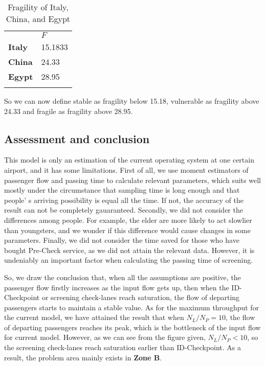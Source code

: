 \documentclass{mcmthesis}
\newlength\savedwidth
\newcommand\whline{\noalign{\global\savedwidth\arrayrulewidth
		\global\arrayrulewidth 1.2pt}%
	\hline
	\noalign{\global\arrayrulewidth\savedwidth}}
\newlength\savewidth
\newcommand\shline{\noalign{\global\savewidth\arrayrulewidth
		\global\arrayrulewidth 1.2pt}%
	\hline
	\noalign{\global\arrayrulewidth\savewidth}}
\begin{document}
	\begin{table}[htbp]
		\renewcommand\arraystretch{1.5}
		\footnotesize
		\centering
		\begin{tabular}{m{2cm}<{\centering}|m{5cm}<{\centering}}
			\whline
			&\textbf{$F$}\\
			\whline
			\textbf{Italy} & 15.1833\\
			
			\textbf{China} & 24.33\\
			
			\textbf{Egypt} & 28.95\\
			
			\shline
		\end{tabular}
		\caption{Fragility of Italy, China, and Egypt}\label{tab:Fragility  of Italy, China, and Egypt}
	\end{table}
	
	So we can now define stable as fragility below 15.18, vulnerable as fragility above 24.33 and fragile as fragility above 28.95.
	
	\subsection{Assessment and conclusion}
	This model is only an estimation of the current operating system at one certain airport, and it has some limitations. First of all, we use moment estimators of passenger flow and passing time to calculate relevant parameters, which suits well mostly under the circumstance that sampling time is long enough and that people' s  arriving possibility is equal all the time. If not, the accuracy of the result can not be completely gauaranteed. Secondly, we did not consider the differences among people. For example, the elder are more likely to act slowlier than youngsters, and we wonder if this difference would cause changes in some parameters. Finally, we did not consider the time saved for those who have bought Pre-Check service, as we did not attain the relevant data. However, it is undeniably an important factor when calculating the passing time of screening.
	
	So, we draw the conclusion that, when all the assumptions are positive, the passenger flow firstly increases as the input flow gets up, then when the ID-Checkpoint or screening check-lanes reach saturation, the flow of departing passengers starts to maintain a stable value. As for the maximum throughput for the current model, we have attained the result that when $N_L/N_P=10$, the flow of departing passengers reaches its peak, which is the bottleneck of the input flow for current model. However, as we can see from the figure given, $N_L/N_P<10$, so the screening check-lanes reach saturation earlier than ID-Checkpoint. As a result, the problem area mainly exists in \textbf{Zone B}.
	
\end{document}
